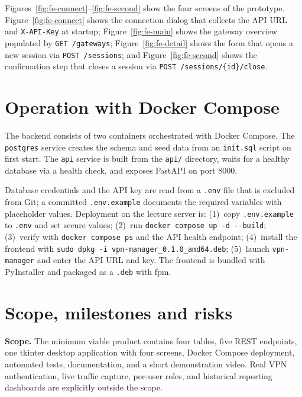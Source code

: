 \documentclass[11pt,a4paper]{article}
\begin{document}
Figures~\ref{fig:fe-connect}--\ref{fig:fe-second} show the four screens of the
prototype. Figure~\ref{fig:fe-connect} shows the connection dialog that collects
the API URL and \texttt{X-API-Key} at startup; Figure~\ref{fig:fe-main} shows
the gateway overview populated by \texttt{GET /gateways}; Figure~\ref{fig:fe-detail}
shows the form that opens a new session via \texttt{POST /sessions}; and
Figure~\ref{fig:fe-second} shows the confirmation step that closes a session via
\texttt{POST /sessions/\{id\}/close}.

\section{Operation with Docker Compose}

The backend consists of two containers orchestrated with Docker Compose. The
\texttt{postgres} service creates the schema and seed data from an
\texttt{init.sql} script on first start. The \texttt{api} service is built from
the \texttt{api/} directory, waits for a healthy database via a health check,
and exposes FastAPI on port 8000.

Database credentials and the API key are read from a \texttt{.env} file that is
excluded from Git; a committed \texttt{.env.example} documents the required
variables with placeholder values. Deployment on the lecture server is:
(1)~copy \texttt{.env.example} to \texttt{.env} and set secure values;
(2)~run \texttt{docker compose up -d -\/-build};
(3)~verify with \texttt{docker compose ps} and the API health endpoint;
(4)~install the frontend with \texttt{sudo dpkg -i vpn-manager\_0.1.0\_amd64.deb};
(5)~launch \texttt{vpn-manager} and enter the API URL and key. The frontend is
bundled with PyInstaller and packaged as a \texttt{.deb} with fpm.

\section{Scope, milestones and risks}

\textbf{Scope.} The minimum viable product contains four tables, five REST
endpoints, one tkinter desktop application with four screens, Docker Compose
deployment, automated tests, documentation, and a short demonstration video.
Real VPN authentication, live traffic capture, per-user roles, and historical
reporting dashboards are explicitly outside the scope.
\end{document}
